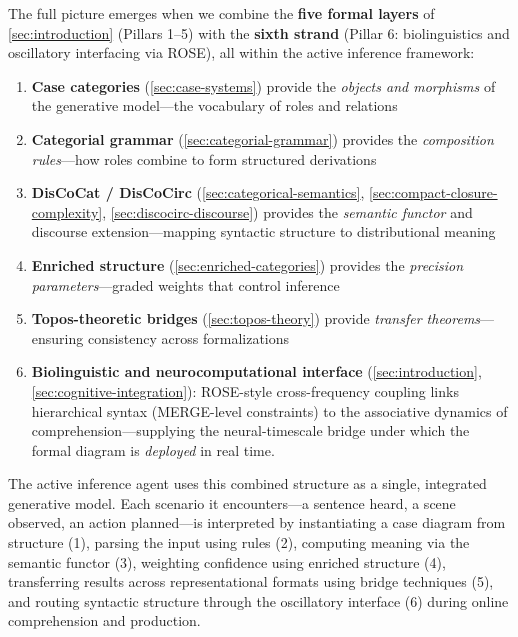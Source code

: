 \documentclass[
]{article}
\providecommand{\tightlist}{%
  \setlength{\itemsep}{0pt}\setlength{\parskip}{0pt}}
\begin{document}
The full picture emerges when we combine the \textbf{five formal layers}
of \autoref{sec:introduction} (Pillars 1--5) with the \textbf{sixth
strand} (Pillar 6: biolinguistics and oscillatory interfacing via ROSE),
all within the active inference framework:

\begin{enumerate}
\def\labelenumi{\arabic{enumi}.}
\tightlist
\item
  \textbf{Case categories} (\autoref{sec:case-systems}) provide the
  \emph{objects and morphisms} of the generative model---the vocabulary
  of roles and relations
\item
  \textbf{Categorial grammar} (\autoref{sec:categorial-grammar})
  provides the \emph{composition rules}---how roles combine to form
  structured derivations
\item
  \textbf{DisCoCat / DisCoCirc} (\autoref{sec:categorical-semantics},
  \autoref{sec:compact-closure-complexity},
  \autoref{sec:discocirc-discourse}) provides the \emph{semantic
  functor} and discourse extension---mapping syntactic structure to
  distributional meaning
\item
  \textbf{Enriched structure} (\autoref{sec:enriched-categories})
  provides the \emph{precision parameters}---graded weights that control
  inference
\item
  \textbf{Topos-theoretic bridges} (\autoref{sec:topos-theory}) provide
  \emph{transfer theorems}---ensuring consistency across formalizations
\item
  \textbf{Biolinguistic and neurocomputational interface}
  (\autoref{sec:introduction}, \autoref{sec:cognitive-integration}):
  ROSE-style cross-frequency coupling links hierarchical syntax
  (MERGE-level constraints) to the associative dynamics of
  comprehension---supplying the neural-timescale bridge under which the
  formal diagram is \emph{deployed} in real time.
\end{enumerate}

The active inference agent uses this combined structure as a single,
integrated generative model. Each scenario it encounters---a sentence
heard, a scene observed, an action planned---is interpreted by
instantiating a case diagram from structure (1), parsing the input using
rules (2), computing meaning via the semantic functor (3), weighting
confidence using enriched structure (4), transferring results across
representational formats using bridge techniques (5), and routing
syntactic structure through the oscillatory interface (6) during online
comprehension and production.
\end{document}
